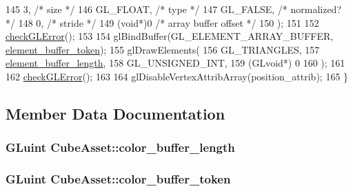 \begin{DoxyCode}
145                         3,                             \textcolor{comment}{/* size */}
146                         GL\_FLOAT,                      \textcolor{comment}{/* type */}
147                         GL\_FALSE,                      \textcolor{comment}{/* normalized? */}
148                         0,                             \textcolor{comment}{/* stride */}
149                         (\textcolor{keywordtype}{void}*)0                       \textcolor{comment}{/* array buffer offset */}
150                         );
151 
152   \hyperlink{CubeAsset_8cc_a75f201b0e53e68726854997957322b8d}{checkGLError}();
153 
154   glBindBuffer(GL\_ELEMENT\_ARRAY\_BUFFER, \hyperlink{classCubeAsset_a4fae699256e7c5633a8174a93ca8a0ec}{element\_buffer\_token});
155   glDrawElements(
156                  GL\_TRIANGLES,
157                  \hyperlink{classCubeAsset_ac66c2ec869f392515dad4ebda1fe4792}{element\_buffer\_length},
158                  GL\_UNSIGNED\_INT,
159                  (GLvoid*) 0
160                  );
161 
162   \hyperlink{CubeAsset_8cc_a75f201b0e53e68726854997957322b8d}{checkGLError}();
163 
164   glDisableVertexAttribArray(position\_attrib);
165 \}
\end{DoxyCode}


\subsection{Member Data Documentation}
\hypertarget{classCubeAsset_ac4c2395c395e9bcebc5d15d425a505ec}{}
\subsubsection[{color\+\_\+buffer\+\_\+length}]{\setlength{\rightskip}{0pt plus 5cm}G\+Luint Cube\+Asset\+::color\+\_\+buffer\+\_\+length\hspace{0.3cm}{\ttfamily [private]}}\label{classCubeAsset_ac4c2395c395e9bcebc5d15d425a505ec}
\hypertarget{classCubeAsset_a4cb558d463a5fa01ba7fdd884e697a73}{}
\subsubsection[{color\+\_\+buffer\+\_\+token}]{\setlength{\rightskip}{0pt plus 5cm}G\+Luint Cube\+Asset\+::color\+\_\+buffer\+\_\+token\hspace{0.3cm}{\ttfamily [private]}}\label{classCubeAsset_a4cb558d463a5fa01ba7fdd884e697a73}
\hypertarget{classCubeAsset_ac66c2ec869f392515dad4ebda1fe4792}{}
